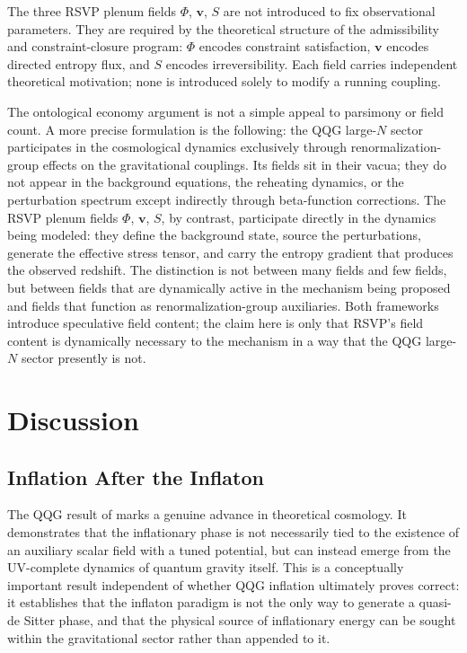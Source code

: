 \documentclass[12pt, a4paper]{article}
\newcommand{\vv}{\mathbf{v}}
\begin{document}
The three RSVP plenum fields $\Phi$, $\vv$, $S$ are not introduced to fix
observational parameters. They are required by the theoretical structure of the
admissibility and constraint-closure program: $\Phi$ encodes constraint
satisfaction, $\vv$ encodes directed entropy flux, and $S$ encodes
irreversibility. Each field carries independent theoretical motivation; none is
introduced solely to modify a running coupling.

The ontological economy argument is not a simple appeal to parsimony or field
count. A more precise formulation is the following: the QQG large-$N$ sector
participates in the cosmological dynamics exclusively through renormalization-group
effects on the gravitational couplings. Its fields sit in their vacua; they do not
appear in the background equations, the reheating dynamics, or the perturbation
spectrum except indirectly through beta-function corrections. The RSVP plenum fields
$\Phi$, $\vv$, $S$, by contrast, participate directly in the dynamics being
modeled: they define the background state, source the perturbations, generate the
effective stress tensor, and carry the entropy gradient that produces the observed
redshift. The distinction is not between many fields and few fields, but between
fields that are dynamically active in the mechanism being proposed and fields that
function as renormalization-group auxiliaries. Both frameworks introduce speculative
field content; the claim here is only that RSVP's field content is dynamically
necessary to the mechanism in a way that the QQG large-$N$ sector presently is not.

\section{Discussion}
\label{sec:discussion}

\subsection{Inflation After the Inflaton}

The QQG result of \citet{Liu2026} marks a genuine advance in theoretical
cosmology. It demonstrates that the inflationary phase is not necessarily tied to
the existence of an auxiliary scalar field with a tuned potential, but can instead
emerge from the UV-complete dynamics of quantum gravity itself. This is a
conceptually important result independent of whether QQG inflation ultimately
proves correct: it establishes that the inflaton paradigm is not the only way to
generate a quasi-de Sitter phase, and that the physical source of inflationary
energy can be sought within the gravitational sector rather than appended to it.
\end{document}
